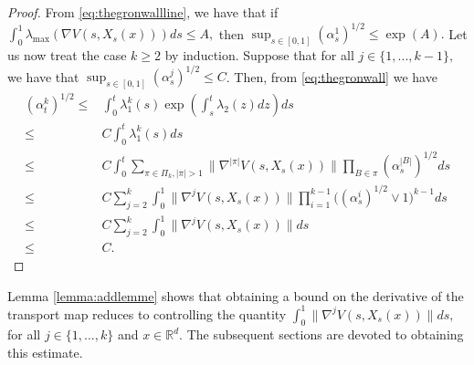\documentclass{article}
\begin{document}
\begin{proof}
From \eqref{eq:thegronwallline}, we have that if
$\int_0^1\lambda_{\max}\left( \nabla V(s,X_s(x))\right)ds\leq A,$
then
$\sup_{s\in [0,1]}(\alpha_s^1)^{1/2}\leq \exp(A).$
Let us now treat the case $k\geq 2$ by induction. Suppose that for all $j\in \{1,...,k-1\},$ we have that 
$\sup_{s\in [0,1]}(\alpha_s^j)^{1/2}\leq C$.
Then, from \eqref{eq:thegronwall} we have 
\begin{align*}
    (\alpha_t^k)^{1/2}\leq & \int_0^t \lambda_{1}^k(s)\exp\left(\int_s^t \lambda_2(z)dz\right)ds\nonumber\\
    \leq &  C\int_0^t \lambda_{1}^k(s)ds\nonumber
    \\
    \leq & C \int_0^t \sum_{\pi \in \Pi_k,|\pi|>1} \|\nabla^{|\pi|}V(s,X_s(x))\| \prod_{B\in \pi} (\alpha_s^{|B|})^{1/2} ds\nonumber\\
    \leq & C \sum_{j=2}^k \int_0^1 \|\nabla^j V(s,X_s(x))\|\prod_{i=1}^{k-1} \Big((\alpha_s^{i})^{1/2} \vee 1 \Big)^{k-1}ds\nonumber\\
   \leq & C\sum_{j=2}^k \int_0^1 \|\nabla^j V(s,X_s(x))\|ds\nonumber\\
   \leq & C.
\end{align*}
\end{proof}


Lemma \ref{lemma:addlemme} shows that obtaining a bound on the derivative of the transport map reduces to controlling the quantity $
\int_0^1 \|\nabla^j V(s,X_s(x))\|ds,
$ for all $j\in \{1,...,k\}$ and $x\in \mathbb{R}^d$. The subsequent sections are devoted to obtaining this estimate.
\end{document}
